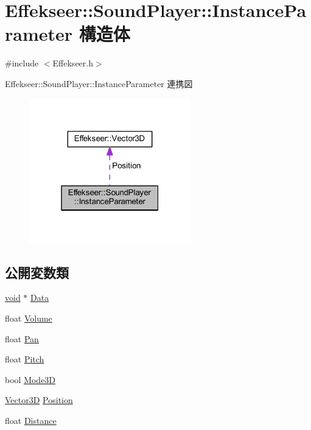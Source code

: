 \hypertarget{struct_effekseer_1_1_sound_player_1_1_instance_parameter}{}\section{Effekseer\+:\+:Sound\+Player\+:\+:Instance\+Parameter 構造体}
\label{struct_effekseer_1_1_sound_player_1_1_instance_parameter}


{\ttfamily \#include $<$Effekseer.\+h$>$}



Effekseer\+:\+:Sound\+Player\+:\+:Instance\+Parameter 連携図\nopagebreak
\begin{figure}[H]
\begin{center}
\leavevmode
\includegraphics[width=199pt]{struct_effekseer_1_1_sound_player_1_1_instance_parameter__coll__graph}
\end{center}
\end{figure}
\subsection*{公開変数類}
\begin{DoxyCompactItemize}
\item 
\mbox{\hyperlink{namespace_effekseer_ab34c4088e512200cf4c2716f168deb56}{void}} $\ast$ \mbox{\hyperlink{struct_effekseer_1_1_sound_player_1_1_instance_parameter_a882efc09266af458007f54298e288150}{Data}}
\item 
float \mbox{\hyperlink{struct_effekseer_1_1_sound_player_1_1_instance_parameter_ab128c51dd7ae26cc09c6a3ee716b9a14}{Volume}}
\item 
float \mbox{\hyperlink{struct_effekseer_1_1_sound_player_1_1_instance_parameter_ade1b072a2382d08ca7dbe7f8ea4a8c08}{Pan}}
\item 
float \mbox{\hyperlink{struct_effekseer_1_1_sound_player_1_1_instance_parameter_a642e90999b491b94def5164be452ee8f}{Pitch}}
\item 
bool \mbox{\hyperlink{struct_effekseer_1_1_sound_player_1_1_instance_parameter_ad80b9ddad2b07d89ecd865f1838cc84a}{Mode3D}}
\item 
\mbox{\hyperlink{struct_effekseer_1_1_vector3_d}{Vector3D}} \mbox{\hyperlink{struct_effekseer_1_1_sound_player_1_1_instance_parameter_a91587aeddc1536abfc346aa2e289fdd1}{Position}}
\item 
float \mbox{\hyperlink{struct_effekseer_1_1_sound_player_1_1_instance_parameter_a89783f7ffd762a9d44580fc302a753b8}{Distance}}
\end{DoxyCompactItemize}



